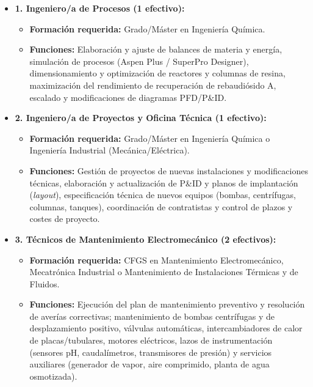 \begin{itemize}[leftmargin=*]
    \item \textbf{1. Ingeniero/a de Procesos (1 efectivo):}
          \begin{itemize}
              \item \textbf{Formación requerida:} Grado/Máster en Ingeniería Química.
              \item \textbf{Funciones:} Elaboración y ajuste de balances de materia y energía, simulación de procesos (Aspen Plus / SuperPro Designer), dimensionamiento y optimización de reactores y columnas de resina, maximización del rendimiento de recuperación de rebaudiósido A, escalado y modificaciones de diagramas PFD/P\&ID.
          \end{itemize}

    \item \textbf{2. Ingeniero/a de Proyectos y Oficina Técnica (1 efectivo):}
          \begin{itemize}
              \item \textbf{Formación requerida:} Grado/Máster en Ingeniería Química o Ingeniería Industrial (Mecánica/Eléctrica).
              \item \textbf{Funciones:} Gestión de proyectos de nuevas instalaciones y modificaciones técnicas, elaboración y actualización de P\&ID y planos de implantación (\textit{layout}), especificación técnica de nuevos equipos (bombas, centrífugas, columnas, tanques), coordinación de contratistas y control de plazos y costes de proyecto.
          \end{itemize}

    \item \textbf{3. Técnicos de Mantenimiento Electromecánico (2 efectivos):}
          \begin{itemize}
              \item \textbf{Formación requerida:} CFGS en Mantenimiento Electromecánico, Mecatrónica Industrial o Mantenimiento de Instalaciones Térmicas y de Fluidos.
              \item \textbf{Funciones:} Ejecución del plan de mantenimiento preventivo y resolución de averías correctivas; mantenimiento de bombas centrífugas y de desplazamiento positivo, válvulas automáticas, intercambiadores de calor de placas/tubulares, motores eléctricos, lazos de instrumentación (sensores pH, caudalímetros, transmisores de presión) y servicios auxiliares (generador de vapor, aire comprimido, planta de agua osmotizada).
          \end{itemize}
\end{itemize}

